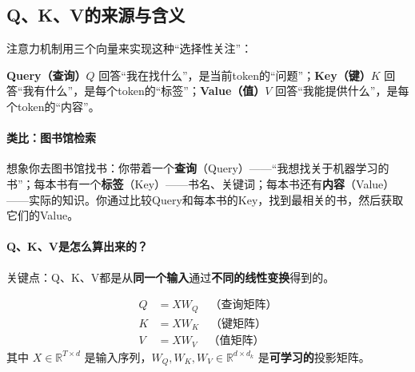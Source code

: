 \subsection{Q、K、V的来源与含义}

注意力机制用三个向量来实现这种“选择性关注”：

\begin{keyidea}[Q、K、V的含义]
\textbf{Query（查询）}$Q$ 回答“我在找什么”，是当前token的“问题”；\textbf{Key（键）}$K$ 回答“我有什么”，是每个token的“标签”；\textbf{Value（值）}$V$ 回答“我能提供什么”，是每个token的“内容”。
\end{keyidea}

\paragraph{类比：图书馆检索}

想象你去图书馆找书：你带着一个\textbf{查询}（Query）——“我想找关于机器学习的书”；每本书有一个\textbf{标签}（Key）——书名、关键词；每本书还有\textbf{内容}（Value）——实际的知识。你通过比较Query和每本书的Key，找到最相关的书，然后获取它们的Value。

\paragraph{Q、K、V是怎么算出来的？}

关键点：Q、K、V都是从\textbf{同一个输入}通过\textbf{不同的线性变换}得到的。

\begin{keyformula}[title=Q、K、V的计算]
\begin{align}
    Q &= X W_Q \quad \text{（查询矩阵）} \\
    K &= X W_K \quad \text{（键矩阵）} \\
    V &= X W_V \quad \text{（值矩阵）}
\end{align}
其中 $X \in \mathbb{R}^{T \times d}$ 是输入序列，$W_Q, W_K, W_V \in \mathbb{R}^{d \times d_k}$ 是\textbf{可学习的}投影矩阵。
\end{keyformula}

